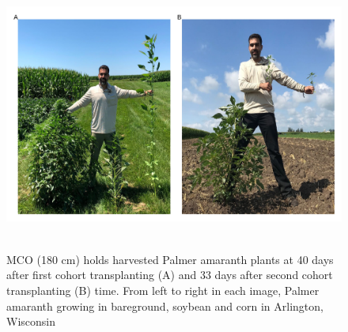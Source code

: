 \documentclass[utf8]{frontiersSCNS}
\begin{document}
\begin{figure}

{\centering \includegraphics[width=150mm,height=90mm]{../data analysis/figures/Figure 6} 

}

\caption{MCO (180 cm) holds harvested Palmer amaranth plants at 40 days after first cohort transplanting (A) and 33 days after second cohort transplanting (B) time. From left to right in each image, Palmer amaranth growing in bareground, soybean and corn in Arlington, Wisconsin}\label{fig:Figure-6}
\end{figure}
\end{document}
